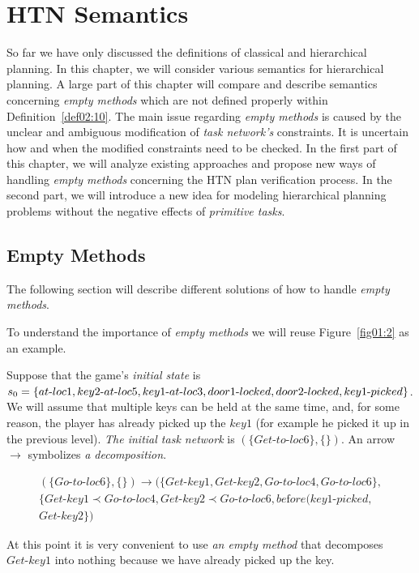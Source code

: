 \chapter{{HTN} Semantics}

\medskip\noindent
So far we have only discussed the definitions of classical and hierarchical planning. In this chapter, we will consider various semantics for hierarchical planning. A large part of this chapter will compare and describe semantics concerning \emph{empty methods} which are not defined properly within Definition~\ref{def02:10}. The main issue regarding \emph{empty methods} is caused by the unclear and ambiguous modification of \emph{task network's} constraints. It is uncertain how and when the modified constraints need to be checked. In the first part of this chapter, we will analyze existing approaches and propose new ways of handling \emph{empty methods} concerning the HTN plan verification process. In the second part, we will introduce a new idea for modeling hierarchical planning problems without the negative effects of \emph{primitive tasks}.

\section{Empty Methods}

\medskip\noindent
The following section will describe different solutions of how to handle \emph{empty methods}.

\begin{example}\label{ex03:5}
    To understand the importance of \emph{empty methods} we will reuse Figure~\ref{fig01:2} as an example.

    Suppose that the game's \emph{initial state} is $s_0 = \{at\text{-}loc1, key2\text{-}at\text{-}loc5, \\ key1\text{-}at\text{-}loc3, door1\text{-}locked, door2\text{-}locked, key1\text{-}picked\}$. We will assume that multiple keys can be held at the same time, and, for some reason, the player has already picked up the $key1$ (for example he picked it up in the previous level). \emph{The initial task network} is $(\{Get\text{-}to\text{-}loc6\}, \{\})$. An arrow $\rightarrow$ symbolizes \emph{a decomposition}.

    \begin{gather*}
       (\{Go\text{-}to\text{-}loc6\}, \{\}) \rightarrow (\{Get\text{-}key1, Get\text{-}key2, Go\text{-}to\text{-}loc4, Go\text{-}to\text{-}loc6\}, \\ \{Get\text{-}key1 \prec Go\text{-}to\text{-}loc4, Get\text{-}key2 \prec Go\text{-}to\text{-}loc6, be\text{f}ore(key1\text{-}picked, \\ Get\text{-}key2\})
    \end{gather*}

    At this point it is very convenient to use \emph{an empty method} that decomposes $Get\text{-}key1$ into nothing because we have already picked up the key.
\end{example}

